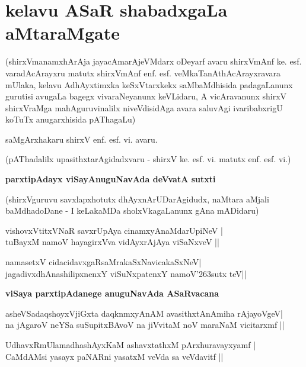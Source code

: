 {\chapter{kelavu ASaR shabadxgaLa aMtaraMgate}}

\noindent
(shirxVmanamxhArAja jayacAmarAjeVMdarx oDeyarf avaru shirxVmAnf ke. esf. varadAcArayxru matutx shirxVmAnf enf. esf. veMkaTanAthAcArayxravara mUlaka, kelavu AdhAyxtimxka keSxVtarxkekx saMbaMdhisida pada\-gaLanunx gurutisi avugaLa bagegx vivaraNeyanunx keVLidaru, A vicAravanunx shirxV shirxVraMga mahAguruvinalilx niveVdisidAga avara saluvAgi ivaribabxrigU koTuTx anugarxhisida pAThagaLu)

\medskip

\hfill{saMgArxhakaru shirxV enf. esf. vi. avaru.}

\medskip
\noindent
\centerline{(pAThadalilx upasithxtarAgidadxvaru - shirxV ke. esf. vi. matutx enf. esf. vi.)}

\bigskip
\noindent
{\large\bf parxtipAdayx viSayAnuguNavAda deVvatA sutxti}\label{page128}
\medskip

\noindent
(shirxVguruvu savxlapxhotutx dhAyxnArUDarAgidudx, naMtara aMjali baMdhadoDane - I keLakaMDa sholxVka\-gaLanunx gAna mADidaru)


\begin{itemize}
\begin{shloka}
\item[(1)] vishovxVtitxVNaR savxrUpAya cinamxyAnaMdarUpiNeV |\\\label{128}
tuBayxM namoV hayagirxVva vidAyxrAjAya viSaNxveV ||
\item[(2)] namasetxV cidacidavxgaRsaMrakaSxNavicakaSxNeV|\\\label{128}
jagadivxdhAnashilipxnenxY viSuNxpatenxY namoV\char'263sutx teV||
\end{shloka}
\end{itemize}

\newpage

\bigskip
\noindent
{\large\bf viSaya parxtipAdanege anuguNavAda ASaRvacana}

\begin{itemize}
{\bf 
\item[(3)] asheVSadaqshoyxVjiGxta daqknmxyAnAM avasithxtAnAmiha rAjayoVgeV|\\\label{128}
na jAgaroV neYSa suSupitxBAvoV na jiVvitaM noV maraNaM vicitarxmf ||
\item[(4)] UdhavxRmUlamadhashAyxKaM ashavxtathxM pArxhuravayxyamf |\\\label{128}
CaMdAMsi yasayx paNARni yasatxM veVda sa veVdavitf ||}
\end{itemize}


